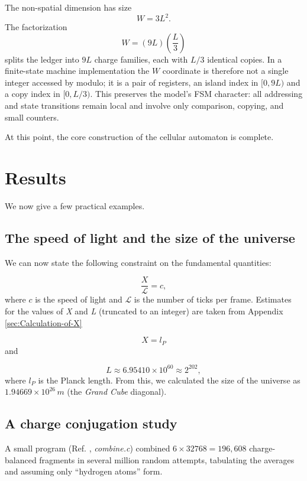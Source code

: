 \documentclass{ijuc}
\begin{document}
The non-spatial dimension has size
\begin{equation}
W = 3L^2.
\end{equation}
The factorization
\begin{equation}
W = (9L)\left(\frac{L}{3}\right)
\end{equation}
splits the ledger into $9L$ charge families, each with $L/3$ identical copies. In a finite-state machine implementation the $W$ coordinate is therefore not a single integer accessed by modulo; it is a pair of registers, an island index in $[0,9L)$ and a copy index in $[0,L/3)$. This preserves the model's FSM character: all addressing and state transitions remain local and involve only comparison, copying, and small counters.


At this point, the core construction of the cellular automaton is complete.

\section{Results}\label{sec:Results}

We now give a few practical examples.

\subsection{The speed of light and the size of the universe}

We can now state the following constraint on the fundamental quantities:

\[
\frac{X}{\mathcal{L}}=c,
\]
where $c$ is the speed of light and $\mathcal{L}$ is the number of ticks per frame. 
Estimates for the values of \emph{X} and \emph{L }(truncated to an integer) are taken from Appendix \ref{sec:Calculation-of-X}

\[
X=l_{P}
\]
and

\[
L\approx6.95410\times10^{60}\approx2^{202},
\]
where $l_{P}$ is the Planck length. From this, we calculated the size of the universe as $1.94669\times10^{26}\,m$ (the \emph{Grand Cube} diagonal).

\subsection{A charge conjugation study}

A small program (Ref. \cite{af_neto}, \emph{combine.c}) combined $6\times32768=196{,}608$ charge-balanced fragments in several million random attempts, tabulating the averages and assuming only ``hydrogen atoms'' form.
\end{document}
